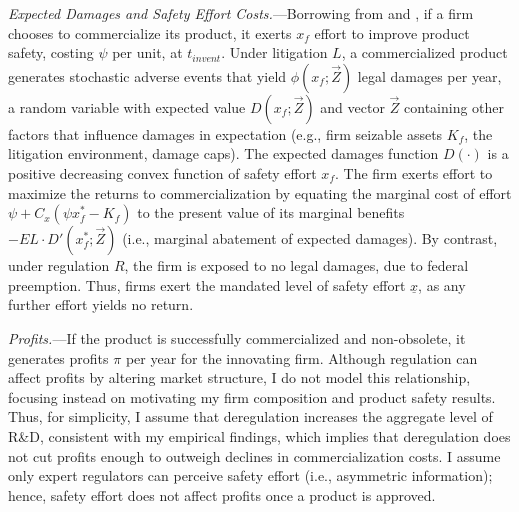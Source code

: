 \documentclass[letterpaper,12pt]{article}
\theoremstyle{definition}
\begin{document}
\textit{Expected Damages and Safety Effort Costs.}---Borrowing from \citet{shavell1986judgment} and \citet{boomhower2019drilling}, if a firm chooses to commercialize its product, it exerts $x_f$ effort to improve product safety, costing $\psi$ per unit, at $t_{invent}$.\footnotemark {} 
Under litigation $L$, a commercialized product generates stochastic adverse events that yield $\phi(x_f;\vec{Z})$ legal damages per year, a random variable with expected value $D(x_f;\vec{Z})$ and vector $\vec{Z}$ containing other factors that influence damages in expectation (e.g., firm seizable assets $K_f$, the litigation environment, damage caps). The expected damages function $D(\cdot)$ is a positive decreasing convex function of safety effort $x_f$. The firm exerts effort to maximize the returns to commercialization by equating the marginal cost of effort $\psi + C_x(\psi x_f^* - K_f)$ to the present value of its marginal benefits $-EL  \cdotp  D'(x_f^*;\vec{Z})$ (i.e., marginal abatement of expected damages).
By contrast, under regulation $R$, the firm is exposed to no legal damages, due to federal preemption. Thus, firms exert the mandated level of safety effort $\underline{x}$, as any further effort yields no return.


\vspace{10pt}



\textit{Profits.}---If the product is successfully commercialized and non-obsolete, it generates profits $\pi$ per year for the innovating firm. Although regulation can affect profits by altering market structure, I do not model this relationship, focusing instead on motivating my firm composition and product safety results. Thus, for simplicity, I assume that deregulation increases the aggregate level of R\&D, consistent with my empirical findings, which implies that deregulation does not cut profits enough to outweigh declines in commercialization costs.\footnotemark {} 
I assume only expert regulators can perceive safety effort (i.e., asymmetric information); hence, safety effort does not affect profits once a product is approved.   
\end{document}

